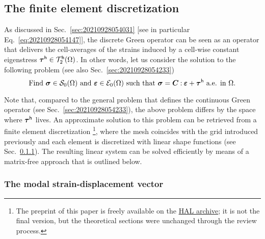 \subsection{The finite element discretization}

As discussed in Sec.~\ref{sec:20210928054031} [see in particular
Eq.~\eqref{eq:20210928054147}], the discrete Green operator can be seen as an
operator that delivers the cell-averages of the strains induced by a cell-wise
constant eigenstress \(\boldsymbol\tau^\mathsf{h}\in\mathcal T_2^\mathsf{h}(\Omega)\). In
other words, let us consider the solution to the following problem (see also
Sec.~\ref{sec:20210928054233})
\begin{equation}
  \label{eq:20210914140834}
  \text{Find }\boldsymbol\sigma\in\mathcal S_0(\Omega)
  \text{ and }\boldsymbol\varepsilon\in\mathcal E_0(\Omega)
  \text{ such that }\boldsymbol\sigma=\boldsymbol C\mathbin{\mathord{:}}\boldsymbol\varepsilon+\boldsymbol\tau^\mathsf{h}
  \text{ a.e. in }\Omega.
\end{equation}

Note that, compared to the general problem that defines the continuous Green
operator (see Sec.~\ref{sec:20210928054233}), the above problem differs by the
space where \(\boldsymbol\tau^\mathsf{h}\) lives. An approximate solution to this
problem can be retrieved from a finite element discretization
\parencite{bris2017}\footnote{The preprint of this paper is freely available on
  the \href{https://hal-enpc.archives-ouvertes.fr/hal-01304603}{HAL archive}; it
  is not the final version, but the theoretical sections were unchanged through
  the review process.}, where the mesh coincides with the grid introduced
previously and each element is discretized with linear shape functions (see
Sec.~\ref{}). The resulting linear system can be solved efficiently by means of
a matrix-free approach that is outlined below.

\subsubsection{The modal strain-displacement vector}

